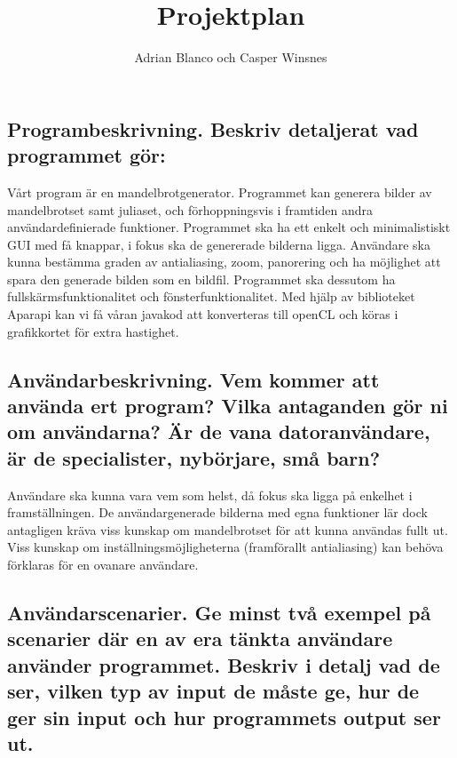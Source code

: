 \documentclass[11pt]{article} %
\title{Projektplan}
\author{Adrian Blanco och Casper Winsnes}
\begin{document}
\maketitle

\subsection{Programbeskrivning. Beskriv detaljerat vad programmet gör:}

Vårt program är en mandelbrotgenerator. Programmet kan generera bilder av mandelbrotset samt juliaset, och förhoppningsvis i framtiden andra användardefinierade funktioner. Programmet ska ha ett enkelt och minimalistiskt GUI med få knappar, i fokus ska de genererade bilderna ligga.
Användare ska kunna bestämma graden av antialiasing, zoom, panorering och ha möjlighet att spara den generade bilden som en bildfil.
Programmet ska dessutom ha fullskärmsfunktionalitet och fönsterfunktionalitet. Med hjälp av biblioteket Aparapi kan vi få våran javakod att konverteras till openCL och köras i grafikkortet för extra hastighet.

\subsection{Användarbeskrivning. Vem kommer att använda ert program? Vilka antaganden gör ni om användarna? Är de vana datoranvändare, är de specialister, nybörjare, små barn?}

Användare ska kunna vara vem som helst, då fokus ska ligga på enkelhet i framställningen. De användargenerade bilderna med egna funktioner lär dock antagligen kräva viss kunskap om mandelbrotset för att kunna användas fullt ut. Viss kunskap om inställningsmöjligheterna (framförallt antialiasing) kan behöva förklaras för en ovanare användare.

\subsection{Användarscenarier. Ge minst två exempel på scenarier där en av era tänkta användare använder programmet. Beskriv i detalj vad de ser, vilken typ av input de måste ge, hur de ger sin input och hur programmets output ser ut.}
\end{document}
